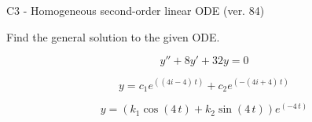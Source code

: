 \begin{exercise}
  \begin{exerciseTitle}C3 - Homogeneous second-order linear ODE (ver. 84)\end{exerciseTitle}
  \begin{exerciseStatement}
    
Find the general solution to the given ODE.

    
\[y''+8y'+32y = 0\]

  \end{exerciseStatement}
  \begin{exerciseAnswer}
    
\[y= c_{1} e^{\left(\left(4 i - 4\right) \, t\right)} + c_{2} e^{\left(-\left(4 i + 4\right) \, t\right)}\]

    
\[y= {\left(k_{1} \cos\left(4 \, t\right) + k_{2} \sin\left(4 \, t\right)\right)} e^{\left(-4 \, t\right)}\]

  \end{exerciseAnswer}
\end{exercise}